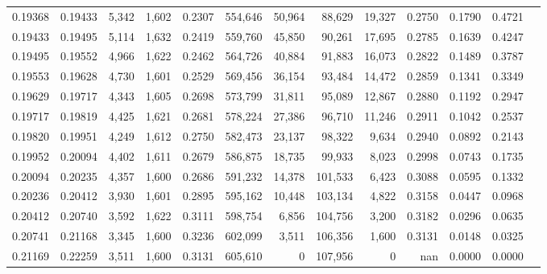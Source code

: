 \begin{tabular}{rrrrrrrrrrrrr}
0.19368 & 0.19433 &  5,342 & 1,602 &                                     0.2307 & 554,646 &  50,964 &  88,629 &  19,327 & 0.2750 & 0.1790 & 0.4721 \\
0.19433 & 0.19495 &  5,114 & 1,632 &                                     0.2419 & 559,760 &  45,850 &  90,261 &  17,695 & 0.2785 & 0.1639 & 0.4247 \\
0.19495 & 0.19552 &  4,966 & 1,622 &                                     0.2462 & 564,726 &  40,884 &  91,883 &  16,073 & 0.2822 & 0.1489 & 0.3787 \\
0.19553 & 0.19628 &  4,730 & 1,601 &                                     0.2529 & 569,456 &  36,154 &  93,484 &  14,472 & 0.2859 & 0.1341 & 0.3349 \\
0.19629 & 0.19717 &  4,343 & 1,605 &                                     0.2698 & 573,799 &  31,811 &  95,089 &  12,867 & 0.2880 & 0.1192 & 0.2947 \\
0.19717 & 0.19819 &  4,425 & 1,621 &                                     0.2681 & 578,224 &  27,386 &  96,710 &  11,246 & 0.2911 & 0.1042 & 0.2537 \\
0.19820 & 0.19951 &  4,249 & 1,612 &                                     0.2750 & 582,473 &  23,137 &  98,322 &   9,634 & 0.2940 & 0.0892 & 0.2143 \\
0.19952 & 0.20094 &  4,402 & 1,611 &                                     0.2679 & 586,875 &  18,735 &  99,933 &   8,023 & 0.2998 & 0.0743 & 0.1735 \\
0.20094 & 0.20235 &  4,357 & 1,600 &                                     0.2686 & 591,232 &  14,378 & 101,533 &   6,423 & 0.3088 & 0.0595 & 0.1332 \\
0.20236 & 0.20412 &  3,930 & 1,601 &                                     0.2895 & 595,162 &  10,448 & 103,134 &   4,822 & 0.3158 & 0.0447 & 0.0968 \\
0.20412 & 0.20740 &  3,592 & 1,622 &                                     0.3111 & 598,754 &   6,856 & 104,756 &   3,200 & 0.3182 & 0.0296 & 0.0635 \\
0.20741 & 0.21168 &  3,345 & 1,600 &                                     0.3236 & 602,099 &   3,511 & 106,356 &   1,600 & 0.3131 & 0.0148 & 0.0325 \\
0.21169 & 0.22259 &  3,511 & 1,600 &                                     0.3131 & 605,610 &       0 & 107,956 &       0 &    nan & 0.0000 & 0.0000 \\
\bottomrule
\end{tabular}
